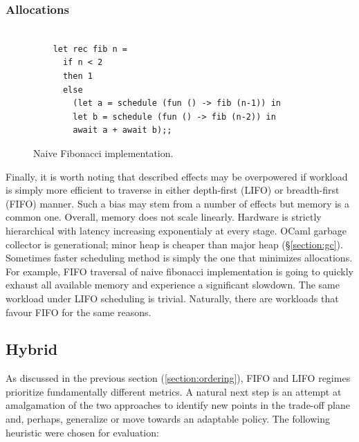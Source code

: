 \documentclass[12pt,a4paper,twoside]{report}
\begin{document}
\subsubsection{Allocations}

\begin{figure}
    \centering
    \begin{verbatim}

    let rec fib n = 
      if n < 2 
      then 1 
      else
        (let a = schedule (fun () -> fib (n-1)) in
        let b = schedule (fun () -> fib (n-2)) in 
        await a + await b);;

    \end{verbatim}
    \caption{Naive Fibonacci implementation.}
    \label{fig:fib-pure}
\end{figure}

Finally, it is worth noting that described effects may be overpowered if workload is simply more efficient to traverse in either depth-first (LIFO) or breadth-first (FIFO) manner. Such a bias may stem from a number of effects but memory is a common one. Overall, memory does not scale linearly. Hardware is strictly hierarchical with latency increasing exponentialy at every stage. OCaml garbage collector is generational; minor heap is cheaper than major heap (\S\ref{section:gc}). Sometimes faster scheduling method is simply the one that minimizes allocations. For example, FIFO traversal of naive fibonacci implementation is going to quickly exhaust all available memory and experience a significant slowdown. The same workload under LIFO scheduling is trivial. Naturally, there are workloads that favour FIFO for the same reasons.

\subsection{Hybrid}
As discussed in the previous section (\ref{section:ordering}), FIFO and LIFO regimes prioritize fundamentally different metrics. A natural next step is an attempt at amalgamation of the two approaches to identify new points in the trade-off plane and, perhaps, generalize or move towards an adaptable policy. The following heuristic were chosen for evaluation: 
\end{document}
